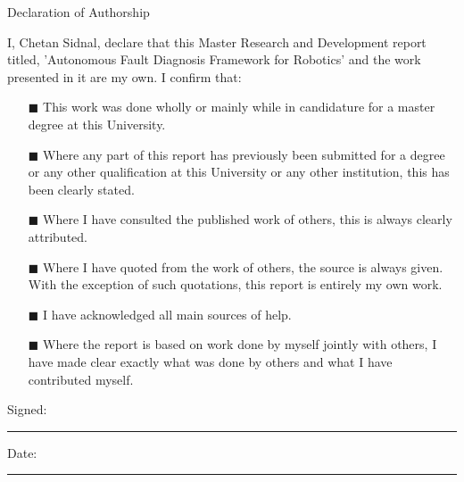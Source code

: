 
\begin{center}
	\begin{Huge}
		Declaration of Authorship
	\end{Huge}
\end{center}




I, Chetan Sidnal, declare that this Master Research and Development report titled, 'Autonomous Fault Diagnosis Framework for Robotics' and the work
presented in it are my own. I confirm that:

\begin{itemize}
\item[\tiny{$\blacksquare$}] This work was done wholly or mainly while in
candidature for a master degree at this University.
\item[\tiny{$\blacksquare$}] Where any part of this report has previously been
submitted for a degree or any other qualification at this University or any other institution, this has been clearly stated.
\item[\tiny{$\blacksquare$}] Where I have consulted the published work of others, this is always clearly attributed.
\item[\tiny{$\blacksquare$}] Where I have quoted from the work of others, the
source is always given. With the exception of such quotations, this report is
entirely my own work.
\item[\tiny{$\blacksquare$}] I have acknowledged all main sources of help.
\item[\tiny{$\blacksquare$}] Where the report is based on work done by myself
jointly with others, I have made clear exactly what was done by others and what I have contributed myself.\\
\end{itemize}

Signed:\\
\rule[1em]{25em}{0.5pt} %

Date:\\
\rule[1em]{25em}{0.5pt} %

\clearpage %
